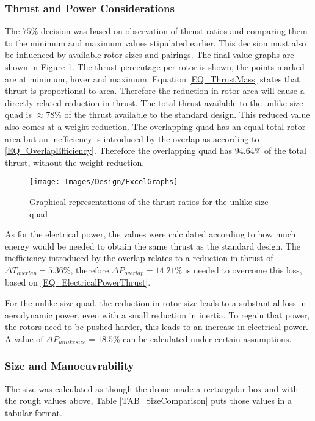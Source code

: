 			\subsubsection{Thrust and Power Considerations}
			The $75\%$ decision was based on observation of thrust ratios and comparing them to the minimum and maximum values stipulated earlier. This decision must also be influenced by available rotor sizes and pairings. The final value graphs are shown in Figure \ref{IM_ExcelGraphs}. The thrust percentage per rotor is shown, the points marked are at minimum, hover and maximum. Equation \eqref{EQ_ThrustMass} states that thrust is proportional to area. Therefore the reduction in rotor area will cause a directly related reduction in thrust. The total thrust available to the unlike size quad is $\approx 78\%$ of the thrust available to the standard design. This reduced value also comes at a weight reduction. The overlapping quad has an equal total rotor area but an inefficiency is introduced by the overlap as according to \eqref{EQ_OverlapEfficiency}. Therefore the overlapping quad has $94.64\%$ of the total thrust, without the weight reduction.
			
			\begin{figure}[H]
			\centering
			\texttt{[image: Images/Design/ExcelGraphs]}
			\caption{Graphical representations of the thrust ratios for the unlike size quad}
			\label{IM_ExcelGraphs}
			\end{figure}
			
			As for the electrical power, the values were calculated according to how much energy would be needed to obtain the same thrust as the standard design. The inefficiency introduced by the overlap relates to a reduction in thrust of $\Delta T_{overlap} = 5.36\%$, therefore $\Delta P_{overlap} = 14.21\%$ is needed to overcome this loss, based on \eqref{EQ_ElectricalPowerThrust}. 
			
			For the unlike size quad, the reduction in rotor size leads to a substantial loss in aerodynamic power, even with a small reduction in inertia. To regain that power, the rotors need to be pushed harder, this leads to an increase in electrical power. A value of $\Delta P_{unlike size} = 18.5\%$ can be calculated under certain assumptions.
	
			\subsubsection{Size and Manoeuvrability}
			The size was calculated as though the drone made a rectangular box and with the rough values above, Table \ref{TAB_SizeComparison} puts those values in a tabular format.
			

